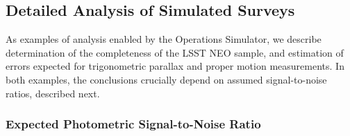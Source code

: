 \documentclass{emulateapj}
\begin{document}
\subsection{  Detailed Analysis of Simulated Surveys  } 

As examples of analysis enabled by the Operations Simulator, we describe 
determination of the completeness of the LSST NEO sample, and estimation 
of errors expected for trigonometric parallax and proper motion measurements. 
In both examples, the conclusions crucially depend on assumed signal-to-noise
ratios, described next.

\subsubsection{  Expected Photometric Signal-to-Noise Ratio } 
\end{document}
